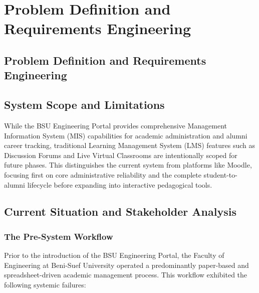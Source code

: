 
\chapter{Problem Definition and Requirements Engineering}
\label{chap:requirements}
\newpage
\section*{Problem Definition and Requirements Engineering}


\section{System Scope and Limitations}
While the BSU Engineering Portal provides comprehensive Management Information System (MIS) capabilities for academic administration and alumni career tracking, traditional Learning Management System (LMS) features such as Discussion Forums and Live Virtual Classrooms are intentionally scoped for future phases. This distinguishes the current system from platforms like Moodle, focusing first on core administrative reliability and the complete student-to-alumni lifecycle before expanding into interactive pedagogical tools.

\section{Current Situation and Stakeholder Analysis}
\label{sec:current-situation}

\subsection{The Pre-System Workflow}

Prior to the introduction of the BSU Engineering Portal, the Faculty of Engineering at Beni-Suef University operated a predominantly paper-based and spreadsheet-driven academic management process. This workflow exhibited the following systemic failures:

